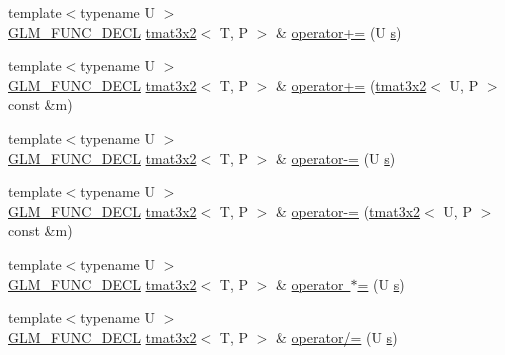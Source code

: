 \begin{DoxyCompactItemize}
\item 
{\footnotesize template$<$typename U $>$ }\\\mbox{\hyperlink{setup_8hpp_ab2d052de21a70539923e9bcbf6e83a51}{G\+L\+M\+\_\+\+F\+U\+N\+C\+\_\+\+D\+E\+CL}} \mbox{\hyperlink{structglm_1_1tmat3x2}{tmat3x2}}$<$ T, P $>$ \& \mbox{\hyperlink{structglm_1_1tmat3x2_a20c86d9ea265c20b6605d28b2d84fd3a}{operator+=}} (U \mbox{\hyperlink{glad_8h_af1b1d5edfea6a34daee7389b1b5810ad}{s}})
\item 
{\footnotesize template$<$typename U $>$ }\\\mbox{\hyperlink{setup_8hpp_ab2d052de21a70539923e9bcbf6e83a51}{G\+L\+M\+\_\+\+F\+U\+N\+C\+\_\+\+D\+E\+CL}} \mbox{\hyperlink{structglm_1_1tmat3x2}{tmat3x2}}$<$ T, P $>$ \& \mbox{\hyperlink{structglm_1_1tmat3x2_a75faae5987f07b3f08a1843c3b6a71f0}{operator+=}} (\mbox{\hyperlink{structglm_1_1tmat3x2}{tmat3x2}}$<$ U, P $>$ const \&m)
\item 
{\footnotesize template$<$typename U $>$ }\\\mbox{\hyperlink{setup_8hpp_ab2d052de21a70539923e9bcbf6e83a51}{G\+L\+M\+\_\+\+F\+U\+N\+C\+\_\+\+D\+E\+CL}} \mbox{\hyperlink{structglm_1_1tmat3x2}{tmat3x2}}$<$ T, P $>$ \& \mbox{\hyperlink{structglm_1_1tmat3x2_a5ecf048090305a4539010afcb534654b}{operator-\/=}} (U \mbox{\hyperlink{glad_8h_af1b1d5edfea6a34daee7389b1b5810ad}{s}})
\item 
{\footnotesize template$<$typename U $>$ }\\\mbox{\hyperlink{setup_8hpp_ab2d052de21a70539923e9bcbf6e83a51}{G\+L\+M\+\_\+\+F\+U\+N\+C\+\_\+\+D\+E\+CL}} \mbox{\hyperlink{structglm_1_1tmat3x2}{tmat3x2}}$<$ T, P $>$ \& \mbox{\hyperlink{structglm_1_1tmat3x2_a83a6c7b5f90654989b78deda2e1ccf20}{operator-\/=}} (\mbox{\hyperlink{structglm_1_1tmat3x2}{tmat3x2}}$<$ U, P $>$ const \&m)
\item 
{\footnotesize template$<$typename U $>$ }\\\mbox{\hyperlink{setup_8hpp_ab2d052de21a70539923e9bcbf6e83a51}{G\+L\+M\+\_\+\+F\+U\+N\+C\+\_\+\+D\+E\+CL}} \mbox{\hyperlink{structglm_1_1tmat3x2}{tmat3x2}}$<$ T, P $>$ \& \mbox{\hyperlink{structglm_1_1tmat3x2_a40719c2af8b2cc290b6b9ad8c2115dcc}{operator $\ast$=}} (U \mbox{\hyperlink{glad_8h_af1b1d5edfea6a34daee7389b1b5810ad}{s}})
\item 
{\footnotesize template$<$typename U $>$ }\\\mbox{\hyperlink{setup_8hpp_ab2d052de21a70539923e9bcbf6e83a51}{G\+L\+M\+\_\+\+F\+U\+N\+C\+\_\+\+D\+E\+CL}} \mbox{\hyperlink{structglm_1_1tmat3x2}{tmat3x2}}$<$ T, P $>$ \& \mbox{\hyperlink{structglm_1_1tmat3x2_a824a792e163b060114a4df6f1de292a9}{operator/=}} (U \mbox{\hyperlink{glad_8h_af1b1d5edfea6a34daee7389b1b5810ad}{s}})

\end{DoxyCompactItemize}
